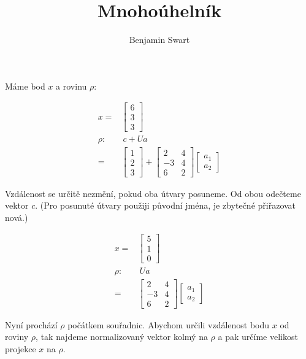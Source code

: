\documentclass{article}
\title{Mnohoúhelník}
\author{Benjamin Swart}
\begin{document}
Máme bod $x$ a rovinu $\rho$:

\begin{align*}
    x =   & \begin{bmatrix}
                6 \\ 3 \\ 3
            \end{bmatrix} \\
    \rho: & \ c + U a      \\
    =     &
    \begin{bmatrix}
        1 \\ 2 \\ 3
    \end{bmatrix} +
    \begin{bmatrix}
        2  & 4 \\
        -3 & 4 \\
        6  & 2
    \end{bmatrix}
    \begin{bmatrix}
        a_1 \\
        a_2
    \end{bmatrix}
\end{align*}

Vzdálenost se určitě nezmění, pokud oba útvary posuneme. Od obou odečteme vektor $c$. (Pro posunuté útvary použiji původní jména, je zbytečné přiřazovat nová.)

\begin{align*}
    x =   & \begin{bmatrix}
                5 \\
                1 \\
                0
            \end{bmatrix} \\
    \rho: & \ U a          \\
    =     &
    \begin{bmatrix}
        2  & 4 \\
        -3 & 4 \\
        6  & 2
    \end{bmatrix}
    \begin{bmatrix}
        a_1 \\
        a_2
    \end{bmatrix}
\end{align*}

Nyní prochází $\rho$ počátkem souřadnic. Abychom určili vzdálenost bodu $x$ od roviny $\rho$, tak najdeme normalizovaný vektor kolmý na $\rho$ a pak určíme velikost projekce $x$ na $\rho$.
\end{document}

